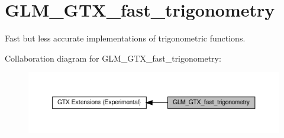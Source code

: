 \hypertarget{group__gtx__fast__trigonometry}{}\section{G\+L\+M\+\_\+\+G\+T\+X\+\_\+fast\+\_\+trigonometry}
\label{group__gtx__fast__trigonometry}


Fast but less accurate implementations of trigonometric functions.  


Collaboration diagram for G\+L\+M\+\_\+\+G\+T\+X\+\_\+fast\+\_\+trigonometry\+:\nopagebreak
\begin{figure}[H]
\begin{center}
\leavevmode
\includegraphics[width=350pt]{group__gtx__fast__trigonometry}
\end{center}
\end{figure}
